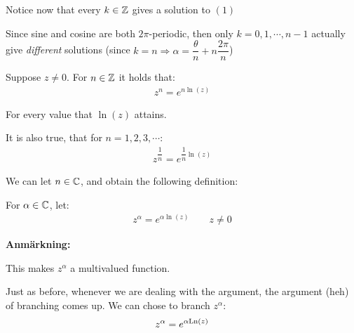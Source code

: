 \noindent Notice now that every $k\in\mathbb{Z}$ gives a solution to $(1)$
\par\bigskip
\noindent Since sine and cosine are both $2\pi$-periodic, then only $k = 0,1,\cdots,n-1$ actually give \textit{different} solutions (since $k=n\Rightarrow \alpha = \dfrac{\theta}{n}+n\dfrac{2\pi}{n}$)
\par\bigskip
\noindent Suppose $z\neq0$. For $n\in\mathbb{Z}$ it holds that:
\begin{equation*}
  \begin{gathered}
    z^n = e^{n\ln{\left(z\right)}}
  \end{gathered}
\end{equation*}\par
\noindent For every value that $\ln{\left(z\right)}$ attains.
\par\bigskip
\noindent It is also true, that for $n = 1,2,3,\cdots$:
\begin{equation*}
  \begin{gathered}
    z^{\dfrac{1}{n}} = e^{\dfrac{1}{n}\ln{\left(z\right)}}
  \end{gathered}
\end{equation*}
\par\bigskip
\noindent We can let $n\in\mathbb{C}$, and obtain the following definition:
\par\bigskip
\begin{theo}{}
  For $\alpha\in\mathbb{C}$, let:
  \begin{equation*}
    \begin{gathered}
      z^\alpha = e^{\alpha\ln{\left(z\right)}}\qquad z\neq0
    \end{gathered}
  \end{equation*}
\end{theo}
\par\bigskip
\noindent\textbf{Anmärkning:}\par
\noindent This makes $z^\alpha$ a multivalued function.
\par\bigskip
\noindent Just as before, whenever we are dealing with the argument, the argument (heh) of branching comes up. We can chose to branch $z^\alpha$:
\begin{equation*}
  \begin{gathered}
    z^\alpha = e^{\alpha\text{Ln}\left(z\right)}
  \end{gathered}
\end{equation*}
\par\bigskip
